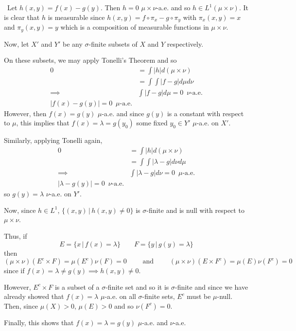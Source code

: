 \documentclass[12pt]{Qual}
\begin{document}
\begin{solution}$\,$
Let $h(x,y)=f(x)-g(y)$. Then $h=0$ $\mu\times\nu$-a.e. and so $h\in L^1(\mu\times\nu)$. It is clear that $h$ is measurable since $h(x,y)=f\circ\pi_x-g\circ\pi_y$ with $\pi_x(x,y)=x$ and $\pi_y(x,y)=y$ which is a composition of measurable functions in $\mu\times\nu$.

Now, let $X'$ and $Y'$ be any $\sigma$-finite subsets of $X$ and $Y$ respectively.

On these subsets, we may apply Tonelli's Theorem and so \begin{align*}
    0&=\int|h|d(\mu\times\nu)\\
    &=\int\int|f-g|d\mu d\nu\\
    \implies &\int|f-g|d\mu=0\,\,\, \nu\text{-a.e.}\\
    |f(x)-g(y)|=0\,\,\,\mu\text{-a.e.}
\end{align*}
However, then $f(x)=g(y)$ $\mu$-a.e. and since $g(y)$ is a constant with respect to $\mu$, this implies that $f(x)=\lambda=g(y_0)$ some fixed $y_0\in Y'$ $\mu$-a.e. on $X'$.

Similarly, applying Tonelli again, \begin{align*}
    0&=\int|h|d(\mu\times\nu)\\
    &=\int\int|\lambda-g|d\nu d\mu\\
    \implies &\int|\lambda-g|d\nu=0\,\,\, \mu\text{-a.e.}\\
    |\lambda-g(y)|=0\,\,\,\nu\text{-a.e.}
\end{align*}
so $g(y)=\lambda$ $\nu$-a.e. on $Y'$.

Now, since $h\in L^1$, $\{(x,y)\,|\,h(x,y)\not=0\}$ is $\sigma$-finite and is null with respect to $\mu\times\nu$.

Thus, if $$E=\{x\,|\,f(x)=\lambda\}\qquad F=\{y\,|\, g(y)=\lambda\}$$ then $$(\mu\times\nu)(E^c\times F)=\mu(E^c)\nu(F)=0\qquad\text{ and }\qquad (\mu\times\nu)(E\times F^c)=\mu(E)\nu(F^c)=0$$ since if $f(x)=\lambda\not=g(y)\implies h(x,y)\not=0$.

However, $E^c\times F$ is a subset of a $\sigma$-finite set and so it is $\sigma$-finite and since we have already showed that $f(x)=\lambda$ $\mu$-a.e. on all $\sigma$-finite sets, $E^c$ must be $\mu$-null. Then, since $\mu(X)>0$, $\mu(E)>0$ and so $\nu(F^c)=0$.

Finally, this shows that $f(x)=\lambda=g(y)$ $\mu$-a.e. and $\nu$-a.e.
\end{solution}
\vspace{0.5cm}
\end{document}
